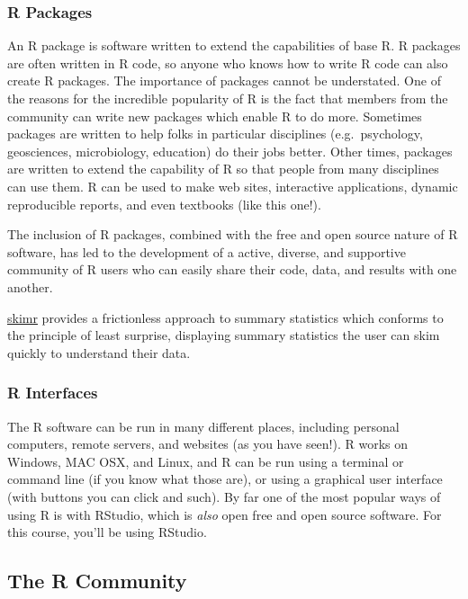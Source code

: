 \documentclass[
]{article}
\newenvironment{bonus}{
  \specialblock{bonus}{sun-fill.png}{Bonus}
}{\endspecialblock}
\begin{document}
\hypertarget{r-packages}{%
\subsubsection{R Packages}\label{r-packages}}

An R package is software written to extend the capabilities of base R.
R packages are often written in R code, so anyone who knows how to write R code can also create R packages.
The importance of packages cannot be understated.
One of the reasons for the incredible popularity of R is the fact that members from the community can write new packages which enable R to do more.
Sometimes packages are written to help folks in particular disciplines (e.g.~psychology, geosciences, microbiology, education) do their jobs better.
Other times, packages are written to extend the capability of R so that people from many disciplines can use them.
R can be used to make web sites, interactive applications, dynamic reproducible reports, and even textbooks (like this one!).

The inclusion of R packages, combined with the free and open source nature of R software, has led to the development of a active, diverse, and supportive community of R users who can easily share their code, data, and results with one another.

\begin{bonus}
\href{https://github.com/ropensci/skimr}{skimr} provides a frictionless
approach to summary statistics which conforms to the principle of least
surprise, displaying summary statistics the user can skim quickly to
understand their data.
\end{bonus}

\hypertarget{r-interfaces}{%
\subsubsection{R Interfaces}\label{r-interfaces}}

The R software can be run in many different places, including personal computers, remote servers, and websites (as you have seen!).
R works on Windows, MAC OSX, and Linux, and
R can be run using a terminal or command line (if you know what those are), or using a graphical user interface (with buttons you can click and such).
By far one of the most popular ways of using R is with RStudio, which is \emph{also} open free and open source software.
For this course, you'll be using RStudio.

\hypertarget{the-r-community}{%
\subsection{The R Community}\label{the-r-community}}
\end{document}
